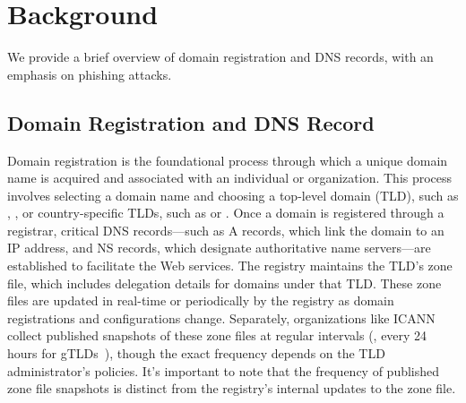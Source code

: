 \section{Background}
\label{sec:background}
We provide a brief overview of domain registration and DNS records, with an emphasis on phishing attacks.


\subsection{Domain Registration and DNS Record}

Domain registration is the foundational process through which a unique domain name is acquired and associated with an individual or organization. 
This process involves selecting a domain name and choosing a top-level domain (TLD), such as , , or country-specific TLDs, such as  or . 
Once a domain is registered through a registrar, critical DNS records---such as A records, which link the domain to an IP address, and NS records, which designate authoritative name servers---are established to facilitate the Web services. 
The registry maintains the TLD's zone file, which includes delegation details for domains under that TLD. 
These zone files are updated in real-time or periodically by the registry as domain registrations and configurations change. 
Separately, organizations like ICANN collect published snapshots of these zone files at regular intervals (\eg, every 24 hours for gTLDs~\cite{HelpCent91:online}), though the exact frequency depends on the TLD administrator’s policies. 
It’s important to note that the frequency of published zone file snapshots is distinct from the registry’s internal updates to the zone file.


